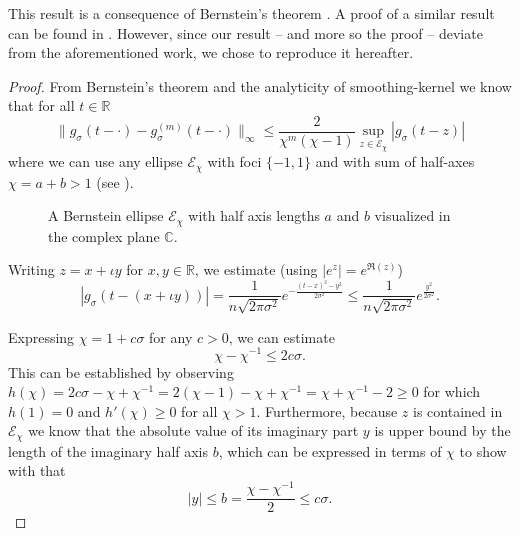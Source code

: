 This result is a consequence of Bernstein's theorem \cite[theorem~4.3]{trefethen2008gauss}.
A proof of a similar result can be found in \cite[theorem~2]{lin2017randomized}.
However, since our result -- and more so the proof -- deviate from the aforementioned
work, we chose to reproduce it hereafter.
\begin{proof}
    From Bernstein's theorem \cite[theorem~4.3]{trefethen2008gauss}
    and the analyticity of \gls{smoothing-kernel} we know that for all $t \in \mathbb{R}$
    \begin{equation}
        \lVert g_{\sigma}(t - \cdot) - g_{\sigma}^{(m)}(t - \cdot) \rVert _{\infty}
        \leq \frac{2}{\chi^{m}(\chi - 1)} \sup_{z \in \mathcal{E}_{\chi}} |g_{\sigma}(t - z)|
        \label{equ:2-chebyshev-convergence-proof-base}
    \end{equation}
    where we can use any ellipse $\mathcal{E}_{\chi}$
    with foci $\{-1, 1\}$ and with sum of half-axes $\chi = a + b > 1$
    (see ).

    \begin{figure}[ht]
        \centering
        
        \caption{A Bernstein ellipse $\mathcal{E}_{\chi}$ with half axis lengths $a$ and
            $b$ visualized in the complex plane $\mathbb{C}$.}
        \label{fig:2-chebyshev-proof-bernstein-ellipse}
    \end{figure}

    Writing $z = x + \iota y$ for $x,y \in \mathbb{R}$, we estimate (using $|e^z| = e^{\Re(z)}$)
    \begin{equation}
        |g_{\sigma}(t - (x + \iota y))| %
        = \frac{1}{n \sqrt{2 \pi \sigma^2}} e^{- \frac{(t - x)^2 - y^2}{2 \sigma^2}}
        \leq \frac{1}{n \sqrt{2 \pi \sigma^2}} e^{\frac{y^2}{2 \sigma^2}}.
    \end{equation}

    Expressing $\chi = 1 + c \sigma$ for any $c > 0$,
    we can estimate
    \begin{equation}
        \chi - \chi^{-1} \leq 2c\sigma.
        \label{equ:2-chebyshev-bernstein-proof-estimate}
    \end{equation}
    This can be established by observing
    $h(\chi) = 2c\sigma - \chi + \chi^{-1} = 2(\chi - 1) - \chi + \chi^{-1} = \chi + \chi^{-1} - 2 \geq 0$
    for which $h(1) = 0$ and $h'(\chi) \geq 0$ for all $\chi > 1$.
    Furthermore, because $z$ is
    contained in $\mathcal{E}_{\chi}$ we know that the absolute value of its
    imaginary part $y$ is upper bound by the length of the imaginary half axis $b$,
    which can be expressed in terms of $\chi$ to show with 
    that
    \begin{equation}
        |y| \leq b = \frac{\chi - \chi^{-1}}{2} \leq c\sigma.
    \end{equation}


\end{proof}
